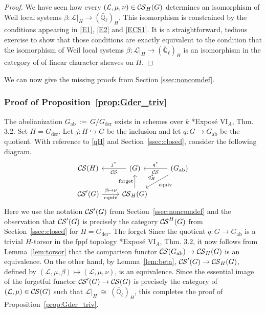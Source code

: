 \documentclass[10pt]{amsart}
\theoremstyle{plain}
\theoremstyle{definition}
\newcommand{\EE}{\mathbb{\bar Q}_\ell}
\newcommand{\Fq}{k}
\newcommand{\der}{_{\operatorname{der}}}
\newcommand{\ab}{_{\operatorname{ab}}}
\newcommand{\ceq}{{\, :=\, }}
\newcommand{\iso}{{\ \cong\ }}
\newcommand{\cs}[1]{{\mathcal{#1}}}
\newcommand{\CS}{{\mathcal{C\hskip-0.8pt S}}}
\begin{document}
\begin{proof}
We have seen how every $(\cs{L},\mu,\nu)\in \CS_H(G)$ determines an isomorphism of Weil local systems $\beta : \cs{L}\vert_{H} \to (\EE)_{H}$.
This isomorphism is constrained by the conditions 
appearing in \eqref{E1}, \eqref{E2} and \eqref{ECS1}.
It is a straightforward, tedious exercise to show that those conditions are exactly equivalent to the condition
that the isomorphism of Weil local systems $\beta : \cs{L}\vert_{H} \to (\EE)_{H}$ is an isomorphism in the category of of linear character sheaves on $H$.
\end{proof}


We can now give the missing proofs from Section \ref{ssec:noncomdef}.

\subsubsection{Proof of Proposition~\ref{prop:Gder_triv}}\label{ssec:proof1}

The abelianization $G\ab\ceq G/G\der$ exists in schemes over $\Fq$ \cite{SGA3}*{Expos\'e {VI}$_A$, Thm. 3.2}.
Set $H=G\der$.
Let $j : H\hookrightarrow G$ be the inclusion and let $q : G \to G\ab$ be the quotient. 
With reference to \eqref{qH} and Section~\ref{ssec:closed}, consider the following diagram.
\[
\begin{tikzcd}
\CS(H) & \arrow{l}[swap]{j^*} \CS(G) &\arrow{l}[swap]{q^*} 
\CS(G\ab) \arrow{dl}{\text{equiv}}[swap]{q_{H}^*} \\
 \CS'(G)  \arrow{r}{\beta \mapsto \nu}[swap]{\text{equiv}} &  \CS_{H}(G) \arrow{u}{\text{forget}}  & 
\end{tikzcd}
\]
%
Here we use the notation $\CS'(G)$ from Section~\ref{ssec:noncomdef} and the observation that $\CS'(G)$ is precisely the category $\CS^{H}(G)$ from Section~\ref{ssec:closed} for $H=G\der$.
The forget
Since the quotient $q : G \to G\ab$ is a trivial $H$-torsor in the fppf topology \cite{SGA3}*{Expos\'e {VI}$_A$, Thm. 3.2}, 
it now follows from Lemma~\ref{lem:torsor} that the comparison functor $\CS(G\ab)\to \CS_{H}(G)$ is an equivalence.
On the other hand, by Lemma~\ref{lem:beta}, $\CS'(G) \to \CS_{H}(G)$, defined by $(\cs{L},\mu,\beta)\mapsto (\cs{L},\mu, \nu)$, is an equivalence.
Since the essential image of the forgetful functor $\CS'(G)\to \CS(G)$ is precisely the category of $(\cs{L},\mu)\in \CS(G)$ such that $\cs{L}\vert_{H} \iso (\EE)_{H}$, this completes the proof of Proposition~\ref{prop:Gder_triv}.
\end{document}

